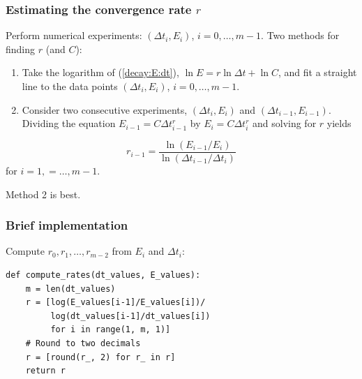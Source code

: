 \documentclass{beamer}
\begin{document}
\begin{frame}
\frametitle{Estimating the convergence rate $r$}

Perform numerical experiments: $(\Delta t_i, E_i)$, $i=0,\ldots,m-1$.
Two methods for finding $r$ (and $C$):

\begin{enumerate}
 \item Take the logarithm of (\ref{decay:E:dt}), $\ln E = r\ln \Delta t + \ln C$,
    and fit a straight line to the data points $(\Delta t_i, E_i)$,
    $i=0,\ldots,m-1$.

 \item Consider two consecutive experiments, $(\Delta t_i, E_i)$ and
    $(\Delta t_{i-1}, E_{i-1})$. Dividing the equation
    $E_{i-1}=C\Delta t_{i-1}^r$ by $E_{i}=C\Delta t_{i}^r$ and solving
    for $r$ yields
\end{enumerate}

\noindent
\begin{equation}
r_{i-1} = \frac{\ln (E_{i-1}/E_i)}{\ln (\Delta t_{i-1}/\Delta t_i)}
\label{decay:conv:rate}
\end{equation}
for $i=1,=\ldots,m-1$.

Method 2 is best.
\end{frame}

\begin{frame}
\frametitle{Brief implementation}

Compute $r_0, r_1, \ldots, r_{m-2}$ from $E_i$ and $\Delta t_i$:

\begin{verbatim}
def compute_rates(dt_values, E_values):
    m = len(dt_values)
    r = [log(E_values[i-1]/E_values[i])/
         log(dt_values[i-1]/dt_values[i])
         for i in range(1, m, 1)]
    # Round to two decimals
    r = [round(r_, 2) for r_ in r]
    return r
\end{verbatim}
\end{frame}
\end{document}
